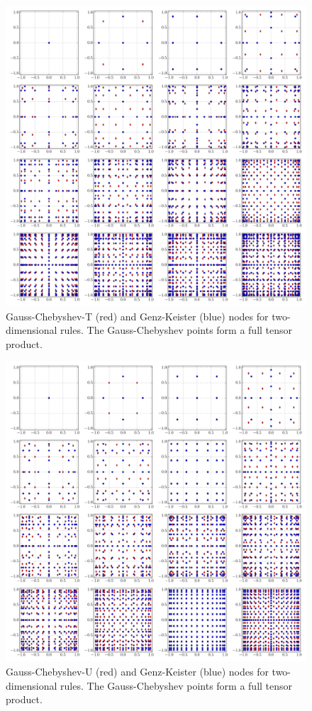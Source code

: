 \documentclass[a4paper,10pt]{article}
\begin{document}
\begin{figure}[h]
  \centering
  \includegraphics[width=\linewidth]{./img/gk_chebyshevt_nodes_2d.pdf}
  \caption{Gauss-Chebyshev-T (red) and Genz-Keister (blue) nodes for
  two-dimensional rules. The Gauss-Chebyshev points form a full tensor
  product.}
  \label{fig:gk_chebyshevt_nodes_2d}
\end{figure}

\begin{figure}[h]
  \centering
  \includegraphics[width=\linewidth]{./img/gk_chebyshevu_nodes_2d.pdf}
  \caption{Gauss-Chebyshev-U (red) and Genz-Keister (blue) nodes for
  two-dimensional rules. The Gauss-Chebyshev points form a full tensor
  product.}
  \label{fig:gk_chebyshevu_nodes_2d}
\end{figure}
\end{document}
